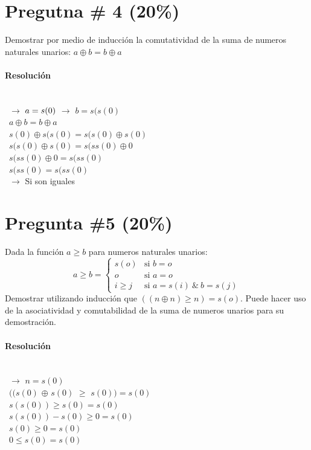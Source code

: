 \documentclass{article}
\begin{document}
\begin{itemize}
\section*{Pregutna \# 4 (20\%)}
Demostrar por medio de inducci\'on la comutatividad de la suma de
numeros naturales unarios: $a\oplus b = b\oplus a$
\paragraph{Resoluci\'on}
\ \\ \ $\rightarrow$ $a=s(0)
\ \\ \ $$\rightarrow$ $ b=s(s(0)$
\ \\ \ $a\oplus b = b\oplus a$
\ \\ \ $s(0)\oplus s(s(0) = s(s(0)  \oplus s(0)$
\ \\ \ $s(s(0) \oplus s(0) = s(ss(0) \oplus 0$
\ \\ \ $s(ss(0) \oplus 0 = s(ss(0)$
\ \\ \ $s(ss(0) = s(ss(0)$
\ \\ \ $\rightarrow$ Si son iguales
\section*{Pregunta \#5 (20\%)}
Dada la funci\'on $a\geq b$ para numeros naturales unarios:
\[
        a\geq b =
                \left\{
                        \begin{array}{ll}
                                s(o)  & \mbox{si } b = o \\
                                o & \mbox{si } a = o \\
                                i\geq j & \mbox{si } a = s(i)\ \&\ b = s(j)
                        \end{array}
                \right.
\]
Demostrar utilizando inducci\'on que $((n\oplus n)\geq n) = s(o)$. Puede
hacer uso de la asociatividad y comutabilidad de la suma de numeros
unarios para su demostraci\'on.
\paragraph{Resoluci\'on}
\ \\ \ $\rightarrow$ $n=s(0)$
\ \\ \ $((s(0)$ $\oplus$ $ s(0)$ $\geq$ $ s(0)) = s(0)$
\ \\ \ $s(s(0)) \geq s(0) = s(0)$
\ \\ \ $s(s(0))-s(0) \geq 0 = s(0)$
\ \\ \ $s(0) \geq 0 = s(0)$
\ \\ \ $0 \leq s(0) = s(0)$
\end{itemize}
\end{document}
